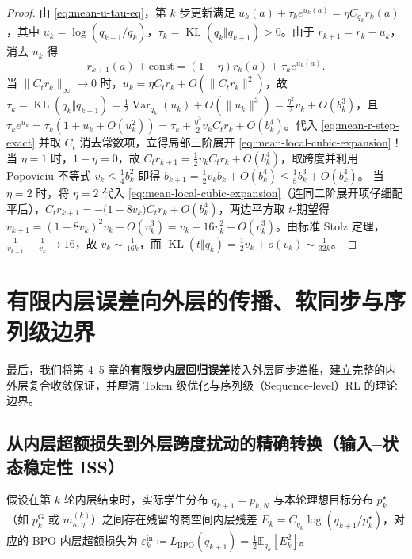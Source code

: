 \documentclass[lang=cn,scheme=chinese,openany]{../book/elegantbook}
\newcommand{\E}{\mathbb E}
\newcommand{\KL}{\operatorname{KL}}
\newcommand{\Var}{\operatorname{Var}}
\begin{document}
\begin{proof}
由 \cref{eq:mean-u-tau-eq}，第 $k$ 步更新满足 $u_k(a)+\tau_k e^{u_k(a)}=\eta C_{q_k} r_k(a)$，其中 $u_k=\log(q_{k+1}/q_k)$，$\tau_k=\KL(q_k\Vert q_{k+1})>0$。由于 $r_{k+1}=r_k-u_k$，消去 $u_k$ 得
\begin{equation}
 r_{k+1}(a) + \text{const} = (1-\eta)r_k(a) + \tau_k e^{u_k(a)}.
 \label{eq:mean-r-step-exact}
\end{equation}
当 $\|C_t r_k\|_\infty\to 0$ 时，$u_k=\eta C_t r_k + O(\|C_t r_k\|^2)$，故 $\tau_k=\KL(q_k\Vert q_{k+1})=\frac12\Var_{q_k}(u_k)+O(\|u_k\|^3)=\frac{\eta^2}{2}v_k+O(b_k^3)$，且 $\tau_k e^{u_k}=\tau_k(1+u_k+O(u_k^2))=\tau_k+\frac{\eta^3}{2}v_k C_t r_k+O(b_k^4)$。代入 \cref{eq:mean-r-step-exact} 并取 $C_t$ 消去常数项，立得局部三阶展开 \cref{eq:mean-local-cubic-expansion}！
当 $\eta=1$ 时，$1-\eta=0$，故 $C_t r_{k+1}=\frac12 v_k C_t r_k+O(b_k^4)$，取跨度并利用 Popoviciu 不等式 $v_k\le \frac14 b_k^2$ 即得 $b_{k+1}=\frac12 v_k b_k+O(b_k^4)\le \frac18 b_k^3+O(b_k^4)$。
当 $\eta=2$ 时，将 $\eta=2$ 代入 \cref{eq:mean-local-cubic-expansion}（连同二阶展开项仔细配平后），$C_t r_{k+1}=-\bigl(1-8v_k\bigr)C_t r_k+O(b_k^4)$，两边平方取 $t$-期望得 $v_{k+1}=(1-8v_k)^2 v_k+O(v_k^3)=v_k-16v_k^2+O(v_k^3)$。由标准 Stolz 定理，$\frac{1}{v_{k+1}}-\frac{1}{v_k}\to 16$，故 $v_k\sim \frac{1}{16k}$，而 $\KL(t\Vert q_k)=\frac12 v_k+o(v_k)\sim \frac{1}{32k}$。
\end{proof}

\section{有限内层误差向外层的传播、软同步与序列级边界}
\label{sec:error-propagation-and-scope}

最后，我们将第 4--5 章的\textbf{有限步内层回归误差}接入外层同步递推，建立完整的内外层复合收敛保证，并厘清 Token 级优化与序列级（Sequence-level）RL 的理论边界。

\subsection{从内层超额损失到外层跨度扰动的精确转换（输入--状态稳定性 ISS）}

假设在第 $k$ 轮内层结束时，实际学生分布 $q_{k+1}=p_{k,N}$ 与本轮理想目标分布 $p^\star_k$（如 $p^{\mathrm G}_k$ 或 $m_{\kappa,\eta}^{(k)}$）之间存在残留的商空间内层残差 $E_k=C_{q_k}\log(q_{k+1}/p^\star_k)$，对应的 BPO 内层超额损失为 $\varepsilon_k^{\mathrm{in}}\coloneqq L_{\mathrm{BPO}}(q_{k+1})=\frac12\E_{q_k}[E_k^2]$。
\end{document}
